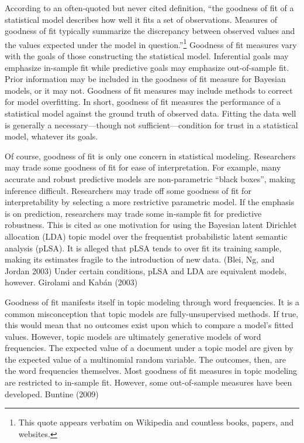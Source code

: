 \documentclass[conference,final,]{IEEEtran}
\begin{document}
According to an often-quoted but never cited definition, ``the goodness
of fit of a statistical model describes how well it fits a set of
observations. Measures of goodness of fit typically summarize the
discrepancy between observed values and the values expected under the
model in question.''\footnote{This quote appears verbatim on Wikipedia
  and countless books, papers, and websites.} Goodness of fit measures
vary with the goals of those constructing the statistical model.
Inferential goals may emphasize in-sample fit while predictive goals may
emphasize out-of-sample fit. Prior information may be included in the
goodness of fit measure for Bayesian models, or it may not. Goodness of
fit measures may include methods to correct for model overfitting. In
short, goodness of fit measures the performance of a statistical model
against the ground truth of observed data. Fitting the data well is
generally a necessary---though not sufficient---condition for trust in a
statistical model, whatever its goals.

Of course, goodness of fit is only one concern in statistical modeling.
Researchers may trade some goodness of fit for ease of interpretation.
For example, many accurate and robust predictive models are
non-parametric ``black boxes'', making inference difficult. Researchers
may trade off some goodness of fit for interpretability by selecting a
more restrictive parametric model. If the emphasis is on prediction,
researchers may trade some in-sample fit for predictive robustness. This
is cited as one motivation for using the Bayesian latent Dirichlet
allocation (LDA) topic model over the frequentist probabilistic latent
semantic analysis (pLSA). It is alleged that pLSA tends to over fit its
training sample, making its estimates fragile to the introduction of new
data. (Blei, Ng, and Jordan 2003) Under certain conditions, pLSA and LDA
are equivalent models, however. Girolami and Kabán (2003)

Goodness of fit manifests itself in topic modeling through word
frequencies. It is a common misconception that topic models are
fully-unsupervised methods. If true, this would mean that no outcomes
exist upon which to compare a model's fitted values. However, topic
models are ultimately generative models of word frequencies. The
expected value of a document under a topic model are given by the
expected value of a multinomial random variable. The outcomes, then, are
the word frequencies themselves. Most goodness of fit measures in topic
modeling are restricted to in-sample fit. However, some out-of-sample
measures have been developed. Buntine (2009)
\end{document}
